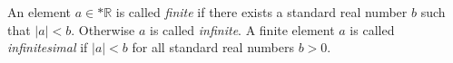 An element $a \in *\mathbb{R}$ is called \emph{finite} if there exists a standard real number $b$ such that $|a| < b$. Otherwise $a$ is called \emph{infinite}. A finite element $a$ is called \emph{infinitesimal} if $|a| < b$ for all standard real numbers $b > 0$.
